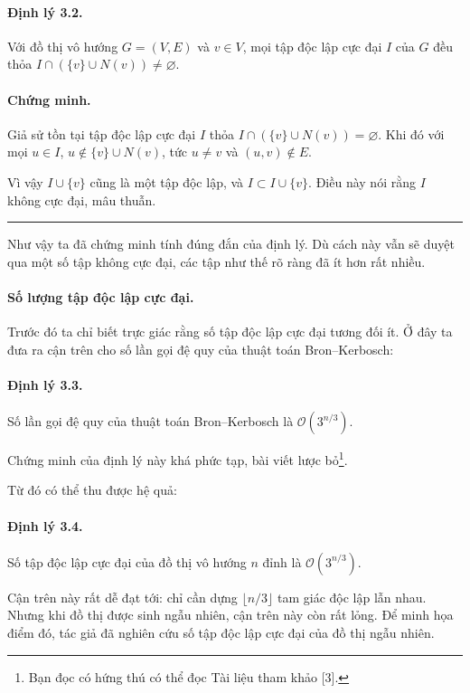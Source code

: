 \documentclass[11pt]{article}
\newcommand{\Oh}{\mathcal{O}}
\newcommand{\qedmark}{\hfill\rule{0.7ex}{0.7ex}}
\begin{document}
\paragraph{Định lý 3.2.}
Với đồ thị vô hướng \(G=(V,E)\) và \(v\in V\), mọi tập độc lập cực đại \(I\)
của \(G\) đều thỏa \(I\cap(\{v\}\cup N(v))\ne\varnothing\).

\paragraph{Chứng minh.}
Giả sử tồn tại tập độc lập cực đại \(I\) thỏa
\(I\cap(\{v\}\cup N(v))=\varnothing\). Khi đó với mọi \(u\in I\),
\(u\notin\{v\}\cup N(v)\), tức \(u\ne v\) và \((u,v)\notin E\).

Vì vậy \(I\cup\{v\}\) cũng là một tập độc lập, và \(I\subset I\cup\{v\}\). Điều
này nói rằng \(I\) không cực đại, mâu thuẫn. \qedmark

Như vậy ta đã chứng minh tính đúng đắn của định lý. Dù cách này vẫn sẽ duyệt
qua một số tập không cực đại, các tập như thế rõ ràng đã ít hơn rất nhiều.

\paragraph{Số lượng tập độc lập cực đại.}
Trước đó ta chỉ biết trực giác rằng số tập độc lập cực đại tương đối ít. Ở đây
ta đưa ra cận trên cho số lần gọi đệ quy của thuật toán Bron--Kerbosch:

\paragraph{Định lý 3.3.}
Số lần gọi đệ quy của thuật toán Bron--Kerbosch là \(\Oh(3^{n/3})\).

Chứng minh của định lý này khá phức tạp, bài viết lược bỏ\footnote{Bạn đọc có
hứng thú có thể đọc Tài liệu tham khảo [3].}.

Từ đó có thể thu được hệ quả:

\paragraph{Định lý 3.4.}
Số tập độc lập cực đại của đồ thị vô hướng \(n\) đỉnh là \(\Oh(3^{n/3})\).

Cận trên này rất dễ đạt tới: chỉ cần dựng \(\lfloor n/3\rfloor\) tam giác độc
lập lẫn nhau. Nhưng khi đồ thị được sinh ngẫu nhiên, cận trên này còn rất
lỏng. Để minh họa điểm đó, tác giả đã nghiên cứu số tập độc lập cực đại của đồ
thị ngẫu nhiên.
\end{document}
